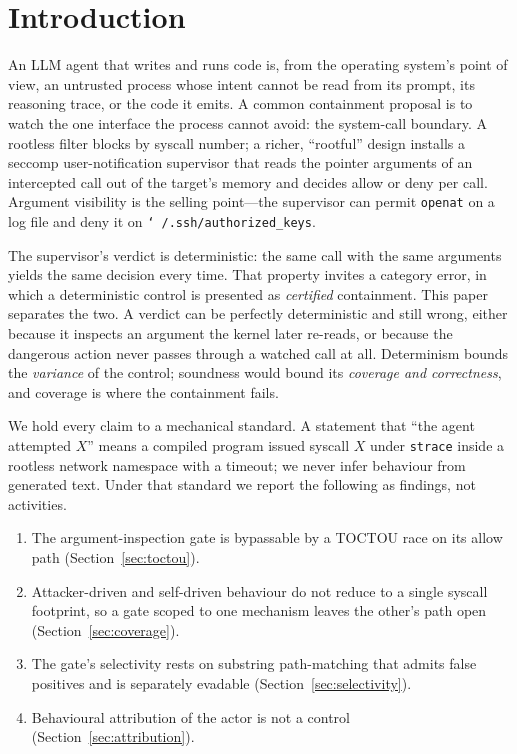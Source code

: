 \documentclass[11pt]{article}
\begin{document}
\section{Introduction}

An LLM agent that writes and runs code is, from the operating system's point of view, an
untrusted process whose intent cannot be read from its prompt, its reasoning trace, or the
code it emits. A common containment proposal is to watch the one interface the process
cannot avoid: the system-call boundary. A rootless filter blocks by syscall number; a
richer, ``rootful'' design installs a seccomp user-notification supervisor that reads the
pointer arguments of an intercepted call out of the target's memory and decides allow or
deny per call. Argument visibility is the selling point---the supervisor can permit
\texttt{openat} on a log file and deny it on \texttt{\char`~/.ssh/authorized\_keys}.

The supervisor's verdict is deterministic: the same call with the same arguments yields the
same decision every time. That property invites a category error, in which a deterministic
control is presented as \emph{certified} containment. This paper separates the two. A
verdict can be perfectly deterministic and still wrong, either because it inspects an
argument the kernel later re-reads, or because the dangerous action never passes through a
watched call at all. Determinism bounds the \emph{variance} of the control; soundness would
bound its \emph{coverage and correctness}, and coverage is where the containment fails.

We hold every claim to a mechanical standard. A statement that ``the agent attempted $X$''
means a compiled program issued syscall $X$ under \texttt{strace} inside a rootless network
namespace with a timeout; we never infer behaviour from generated text. Under that
standard we report the following as findings, not activities.

\begin{enumerate}[leftmargin=1.4em,itemsep=2pt]
\item The argument-inspection gate is bypassable by a TOCTOU race on its allow path
(Section~\ref{sec:toctou}).
\item Attacker-driven and self-driven behaviour do not reduce to a single syscall footprint,
so a gate scoped to one mechanism leaves the other's path open (Section~\ref{sec:coverage}).
\item The gate's selectivity rests on substring path-matching that admits false positives and
is separately evadable (Section~\ref{sec:selectivity}).
\item Behavioural attribution of the actor is not a control (Section~\ref{sec:attribution}).
\end{enumerate}
\end{document}
